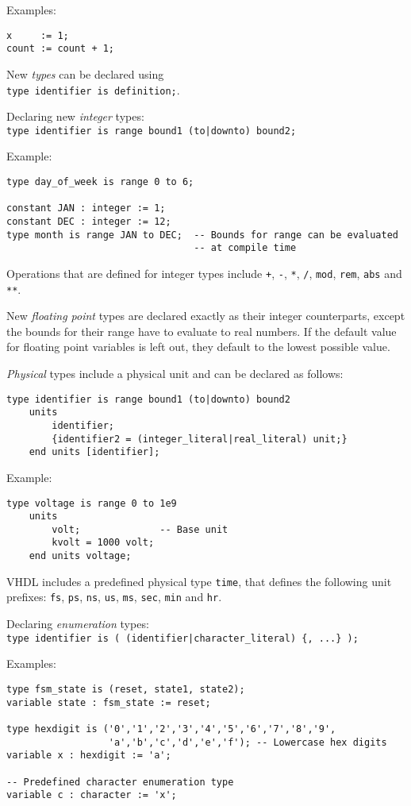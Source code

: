 \documentclass[fontsize=11pt,a4paper]{scrartcl}
\begin{document}
Examples:
\begin{lstlisting}
x     := 1;
count := count + 1;
\end{lstlisting}

New \emph{types} can be declared using\\ \lstinline!type identifier is definition;!.

Declaring new \emph{integer} types:\\ \lstinline!type identifier is range bound1 (to|downto) bound2;!

Example:
\begin{lstlisting}
type day_of_week is range 0 to 6;

constant JAN : integer := 1;
constant DEC : integer := 12;
type month is range JAN to DEC;  -- Bounds for range can be evaluated
                                 -- at compile time
\end{lstlisting}
Operations that are defined for integer types include \lstinline!+!, \lstinline !-!, \lstinline!*!, \lstinline!/!, \lstinline!mod!, \lstinline!rem!, \lstinline!abs! and \lstinline!**!.

New \emph{floating point} types are declared exactly as their integer counterparts, except the bounds for their range have to evaluate to real numbers. If the default value for floating point variables is left out, they default to the lowest possible value.

\emph{Physical} types include a physical unit and can be declared as follows:
\begin{lstlisting}
type identifier is range bound1 (to|downto) bound2
	units
		identifier;
		{identifier2 = (integer_literal|real_literal) unit;}
	end units [identifier];
\end{lstlisting}

Example:
\begin{lstlisting}
type voltage is range 0 to 1e9
	units
		volt;              -- Base unit
		kvolt = 1000 volt;
	end units voltage;
\end{lstlisting}
VHDL includes a predefined physical type \lstinline!time!, that defines the following unit prefixes: \lstinline!fs!, \lstinline!ps!, \lstinline!ns!, \lstinline!us!, \lstinline!ms!, \lstinline!sec!, \lstinline!min! and \lstinline!hr!.

Declaring \emph{enumeration} types:\\ \lstinline!type identifier is ( (identifier|character_literal) {, ...} );!

Examples:
\begin{lstlisting}
type fsm_state is (reset, state1, state2);
variable state : fsm_state := reset;

type hexdigit is ('0','1','2','3','4','5','6','7','8','9',
                  'a','b','c','d','e','f'); -- Lowercase hex digits
variable x : hexdigit := 'a';

-- Predefined character enumeration type
variable c : character := 'x';
\end{lstlisting}
\end{document}

